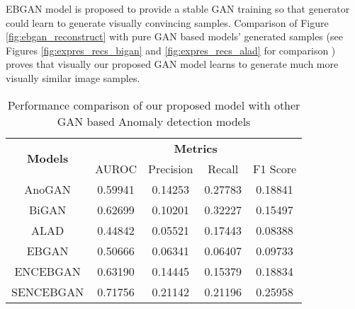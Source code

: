 EBGAN model is proposed to provide a stable GAN training so that generator could learn to generate
visually convincing samples. Comparison of Figure \ref{fig:ebgan_reconstruct} with pure GAN based
models' generated samples (see Figures \ref{fig:expres_recs_bigan} and \ref{fig:expres_recs_alad}
for comparison ) proves that visually our proposed GAN model learns to generate much more visually
similar image samples.

\begin{longtable}[c]{|c|cccc|}
	\caption{Performance  comparison of our proposed model with other GAN based Anomaly detection models}
	\label{tab:proposed_baseline}\\
	\hline
	\multirow{2}{*}{\textbf{Models}} & \multicolumn{4}{c|}{\textbf{Metrics}} \\ \cline{2-5} 
	& AUROC & Precision & Recall & F1 Score \\ \hline
	\endhead
	\multicolumn{1}{|c|}{AnoGAN} & \multicolumn{1}{c}{0.59941} & \multicolumn{1}{c}{0.14253} &
	\multicolumn{1}{c}{0.27783} & \multicolumn{1}{c|}{0.18841} \\ \hline
	\multicolumn{1}{|c|}{BiGAN} & \multicolumn{1}{c}{0.62699} & \multicolumn{1}{c}{0.10201} &
	\multicolumn{1}{c}{0.32227} & \multicolumn{1}{c|}{0.15497} \\ \hline
	\multicolumn{1}{|c|}{ALAD} & \multicolumn{1}{c}{0.44842} & \multicolumn{1}{c}{0.05521} &
	\multicolumn{1}{c}{0.17443} & \multicolumn{1}{c|}{0.08388} \\ \hline
	\multicolumn{1}{|c|}{EBGAN} & \multicolumn{1}{c}{0.50666} & \multicolumn{1}{c}{0.06341} &
	\multicolumn{1}{c}{0.06407} & \multicolumn{1}{c|}{0.09733} \\ \hline
	\multicolumn{1}{|c|}{ ENCEBGAN} & \multicolumn{1}{c}{0.63190} & \multicolumn{1}{c}{0.14445} &
	\multicolumn{1}{c}{0.15379} & \multicolumn{1}{c|}{0.18834} \\ \hline
	\multicolumn{1}{|c|}{ SENCEBGAN} & \multicolumn{1}{c}{0.71756} & \multicolumn{1}{c}{0.21142} &
	\multicolumn{1}{c}{0.21196} & \multicolumn{1}{c|}{0.25958} \\ \hline
\end{longtable}

